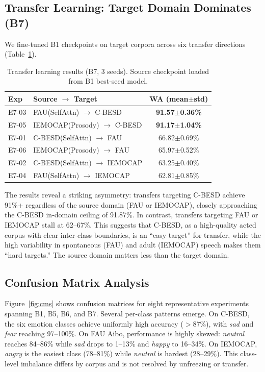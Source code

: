 \subsection{Transfer Learning: Target Domain Dominates (B7)}

We fine-tuned B1 checkpoints on target corpora across six transfer directions (Table~\ref{tab:b7}).

\begin{table}[h]
\centering
\caption{Transfer learning results (B7, 3 seeds). Source checkpoint loaded from B1 best-seed model.}
\label{tab:b7}
\begin{tabular}{llc}
\toprule
\textbf{Exp} & \textbf{Source $\rightarrow$ Target} & \textbf{WA (mean$\pm$std)} \\
\midrule
E7-03 & FAU(SelfAttn) $\rightarrow$ C-BESD    & \textbf{91.57$\pm$0.36\%} \\
E7-05 & IEMOCAP(Prosody) $\rightarrow$ C-BESD  & \textbf{91.17$\pm$1.04\%} \\
E7-01 & C-BESD(SelfAttn) $\rightarrow$ FAU     & 66.82$\pm$0.69\% \\
E7-06 & IEMOCAP(Prosody) $\rightarrow$ FAU     & 65.97$\pm$0.52\% \\
E7-02 & C-BESD(SelfAttn) $\rightarrow$ IEMOCAP & 63.25$\pm$0.40\% \\
E7-04 & FAU(SelfAttn) $\rightarrow$ IEMOCAP    & 62.81$\pm$0.85\% \\
\bottomrule
\end{tabular}
\end{table}

The results reveal a striking asymmetry: transfers targeting C-BESD achieve 91\%+ regardless of the source domain (FAU or IEMOCAP), closely approaching the C-BESD in-domain ceiling of 91.87\%. In contrast, transfers targeting FAU or IEMOCAP stall at 62--67\%. This suggests that C-BESD, as a high-quality acted corpus with clear inter-class boundaries, is an ``easy target'' for transfer, while the high variability in spontaneous (FAU) and adult (IEMOCAP) speech makes them ``hard targets.'' The source domain matters less than the target domain.

\subsection{Confusion Matrix Analysis}

Figure~\ref{fig:cms} shows confusion matrices for eight representative experiments spanning B1, B5, B6, and B7. Several per-class patterns emerge. On C-BESD, the six emotion classes achieve uniformly high accuracy ($>$87\%), with \textit{sad} and \textit{fear} reaching 97--100\%. On FAU Aibo, performance is highly skewed: \textit{neutral} reaches 84--86\% while \textit{sad} drops to 1--13\% and \textit{happy} to 16--34\%. On IEMOCAP, \textit{angry} is the easiest class (78--81\%) while \textit{neutral} is hardest (28--29\%). This class-level imbalance differs by corpus and is not resolved by unfreezing or transfer.


